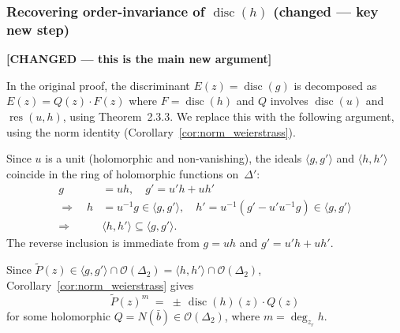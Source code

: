 \documentclass[11pt]{article}
\theoremstyle{plain}
\theoremstyle{definition}
\DeclareMathOperator{\res}{res}
\DeclareMathOperator{\disc}{disc}
\begin{document}
\subsubsection{Recovering order-invariance of \texorpdfstring{$\disc(h)$}{disc(h)}
  (changed --- key new step)}
\label{sssec:recover_discr}

\textbf{[CHANGED --- this is the main new argument]}

In the original proof, the discriminant $E(z) = \disc(g)$ is decomposed as
$E(z) = Q(z) \cdot F(z)$ where $F = \disc(h)$ and $Q$ involves
$\disc(u)$ and $\res(u, h)$, using Theorem~2.3.3.  We replace this with
the following argument, using the norm identity
(Corollary~\ref{cor:norm_weierstrass}).

\medskip

Since $u$ is a unit (holomorphic and non-vanishing), the ideals
$\langle g, g' \rangle$ and $\langle h, h' \rangle$ coincide in the ring
of holomorphic functions on~$\Delta'$:
\begin{align*}
  g &= uh, \quad g' = u'h + uh' \\
  \Longrightarrow\quad
  h &= u^{-1} g \in \langle g, g' \rangle, \quad
  h' = u^{-1}(g' - u' u^{-1} g) \in \langle g, g' \rangle \\
  \Longrightarrow\quad
  &\langle h, h' \rangle \subseteq \langle g, g' \rangle.
\end{align*}
The reverse inclusion is immediate from $g = uh$ and $g' = u'h + uh'$.

Since
$\widetilde{P}(z) \in \langle g, g' \rangle \cap \mathcal{O}(\Delta_2)
= \langle h, h' \rangle \cap \mathcal{O}(\Delta_2)$,
Corollary~\ref{cor:norm_weierstrass} gives
\begin{equation}
  \widetilde{P}(z)^m \;=\; \pm\,\disc(h)(z) \cdot Q(z)
  \label{eq:Pm_disc_Q}
\end{equation}
for some holomorphic $Q = N(\bar{b}) \in \mathcal{O}(\Delta_2)$,
where $m = \deg_{z_r} h$.
\end{document}
